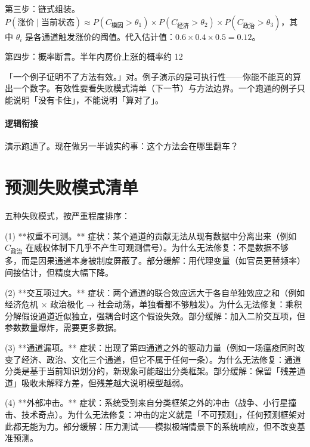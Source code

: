 \documentclass[../../main2.tex]{subfiles}
\begin{document}
	第三步：链式组装。$P(\text{涨价} \mid \text{当前状态}) \approx P(C_{\text{模因}} > \theta_1) \times P(C_{\text{经济}} > \theta_2) \times P(C_{\text{政治}} > \theta_3)$，其中 $\theta_i$ 是各通道触发涨价的阈值。代入估计值：$0.6 \times 0.4 \times 0.5 = 0.12$。

	第四步：概率断言。半年内房价上涨的概率约 12%

	\begin{questionbox}
		「一个例子证明不了方法有效。」对。例子演示的是可执行性——你能不能真的算出一个数字。有效性要看失败模式清单（下一节）与方法边界。一个跑通的例子只能说明「没有卡住」，不能说明「算对了」。
	\end{questionbox}

	\paragraph*{逻辑衔接}
	演示跑通了。现在做另一半诚实的事：这个方法会在哪里翻车？
	\section{预测失败模式清单}
	\label{sec:fc-failure}
	五种失败模式，按严重程度排序：

	(1) **权重不可测。** 症状：某个通道的贡献无法从现有数据中分离出来（例如 $C_{\text{政治}}$ 在威权体制下几乎不产生可观测信号）。为什么无法修复：不是数据不够多，而是因果通道本身被制度屏蔽了。部分缓解：用代理变量（如官员更替频率）间接估计，但精度大幅下降。

	(2) **交互项过大。** 症状：两个通道的联合效应远大于各自单独效应之和（例如经济危机 × 政治极化 → 社会动荡，单独看都不够触发）。为什么无法修复：乘积分解假设通道近似独立，强耦合时这个假设失效。部分缓解：加入二阶交互项，但参数数量爆炸，需要更多数据。

	(3) **通道漏项。** 症状：出现了第四通道之外的驱动力量（例如一场瘟疫同时改变了经济、政治、文化三个通道，但它不属于任何一条）。为什么无法修复：通道分类是基于当前知识划分的，新现象可能超出分类框架。部分缓解：保留「残差通道」吸收未解释方差，但残差越大说明模型越弱。

	(4) **外部冲击。** 症状：系统受到来自分类框架之外的冲击（战争、小行星撞击、技术奇点）。为什么无法修复：冲击的定义就是「不可预测」，任何预测框架对此都无能为力。部分缓解：压力测试——模拟极端情景下的系统响应，但不改变基准预测。
\end{document}
